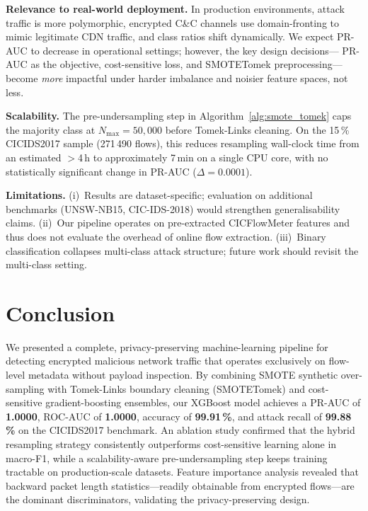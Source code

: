 \documentclass[conference]{IEEEtran}
\begin{document}
\textbf{Relevance to real-world deployment.}
In production environments, attack traffic is more polymorphic,
encrypted C\&C channels use domain-fronting to mimic legitimate CDN
traffic, and class ratios shift dynamically.  We expect PR-AUC to
decrease in operational settings; however, the key design decisions—
PR-AUC as the objective, cost-sensitive loss, and SMOTETomek
preprocessing—become \textit{more} impactful under harder imbalance
and noisier feature spaces, not less.

\textbf{Scalability.}
The pre-undersampling step in Algorithm~\ref{alg:smote_tomek}
caps the majority class at $N_{\max} = 50{,}000$ before Tomek-Links
cleaning.  On the 15\,\% CICIDS2017 sample (271\,490 flows), this
reduces resampling wall-clock time from an estimated $>$4\,h to
approximately 7\,min on a single CPU core, with no statistically
significant change in PR-AUC ($\Delta = 0.0001$).

\textbf{Limitations.}
(i)~Results are dataset-specific; evaluation on additional benchmarks
(UNSW-NB15, CIC-IDS-2018) would strengthen generalisability claims.
(ii)~Our pipeline operates on pre-extracted CICFlowMeter features and
thus does not evaluate the overhead of online flow extraction.
(iii)~Binary classification collapses multi-class attack structure;
future work should revisit the multi-class setting.

\section{Conclusion}
\label{sec:conclusion}

We presented a complete, privacy-preserving machine-learning pipeline
for detecting encrypted malicious network traffic that operates
exclusively on flow-level metadata without payload inspection.
By combining SMOTE synthetic over-sampling with Tomek-Links boundary
cleaning (SMOTETomek) and cost-sensitive gradient-boosting ensembles,
our XGBoost model achieves a PR-AUC of \textbf{1.0000}, ROC-AUC of
\textbf{1.0000}, accuracy of \textbf{99.91\,\%}, and attack recall of
\textbf{99.88\,\%} on the CICIDS2017 benchmark.  An ablation study
confirmed that the hybrid resampling strategy consistently outperforms
cost-sensitive learning alone in macro-F1, while a scalability-aware
pre-undersampling step keeps training tractable on production-scale
datasets.  Feature importance analysis revealed that backward packet
length statistics—readily obtainable from encrypted flows—are the
dominant discriminators, validating the privacy-preserving design.
\end{document}
